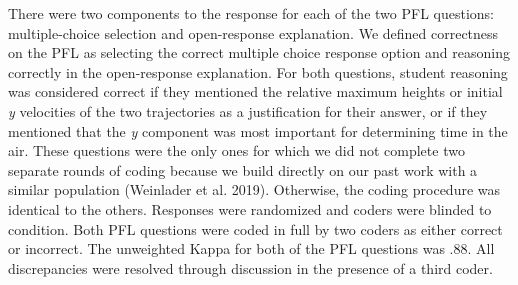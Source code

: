 \documentclass[
  letterpaper,
  DIV=11,
  numbers=noendperiod]{scrreprt}
\begin{document}
There were two components to the response for each of the two PFL
questions: multiple-choice selection and open-response explanation. We
defined correctness on the PFL as selecting the correct multiple choice
response option and reasoning correctly in the open-response
explanation. For both questions, student reasoning was considered
correct if they mentioned the relative maximum heights or initial
\emph{y} velocities of the two trajectories as a justification for their
answer, or if they mentioned that the \emph{y} component was most
important for determining time in the air. These questions were the only
ones for which we did not complete two separate rounds of coding because
we build directly on our past work with a similar population (Weinlader
et al. 2019). Otherwise, the coding procedure was identical to the
others. Responses were randomized and coders were blinded to condition.
Both PFL questions were coded in full by two coders as either correct or
incorrect. The unweighted Kappa for both of the PFL questions was .88.
All discrepancies were resolved through discussion in the presence of a
third coder.
\end{document}
